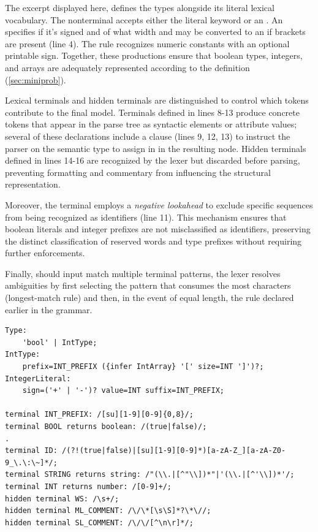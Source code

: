 The excerpt displayed here, defines the types alongside its literal lexical vocabulary. The nonterminal  accepts either the literal keyword  or an . An  specifies if it's signed and of what width and may be converted to an  if brackets are present (line 4).
The  rule recognizes numeric constants with an optional printable sign. Together, these productions ensure that boolean types, integers, and arrays are adequately represented according to the  definition (\ref{sec:miniprob}).

Lexical terminals and hidden terminals are distinguished to control which tokens contribute to the final model. Terminals defined in lines 8-13 produce concrete tokens that appear in the parse tree as syntactic elements or attribute values; several of these declarations include a  clause (lines 9, 12, 13) to instruct the parser on the semantic type to assign in
in the resulting node. Hidden terminals defined in lines 14-16 are recognized by the lexer but discarded before parsing, preventing formatting and commentary from influencing the structural representation.

Moreover, the  terminal employs a \textit{negative lookahead} to exclude specific sequences from being recognized as identifiers (line 11). This mechanism ensures that boolean literals and integer prefixes are not misclassified as identifiers, preserving the distinct classification of reserved words and type prefixes without requiring further enforcements.

Finally, should input match multiple terminal patterns, the lexer resolves ambiguities by first selecting the pattern that consumes the most characters (longest-match rule) and then, in the event of equal length, the rule declared earlier in the grammar.

\begin{verbatim}
Type:
    'bool' | IntType;
IntType:
    prefix=INT_PREFIX ({infer IntArray} '[' size=INT ']')?;
IntegerLiteral:
    sign=('+' | '-')? value=INT suffix=INT_PREFIX;

terminal INT_PREFIX: /[su][1-9][0-9]{0,8}/;
terminal BOOL returns boolean: /(true|false)/;
.
terminal ID: /(?!(true|false)|[su][1-9][0-9]*)[a-zA-Z_][a-zA-Z0-9_\.\:\~]*/;
terminal STRING returns string: /"(\\.|[^"\\])*"|'(\\.|[^'\\])*'/;
terminal INT returns number: /[0-9]+/;
hidden terminal WS: /\s+/;
hidden terminal ML_COMMENT: /\/\*[\s\S]*?\*\//;
hidden terminal SL_COMMENT: /\/\/[^\n\r]*/;
\end{verbatim}

